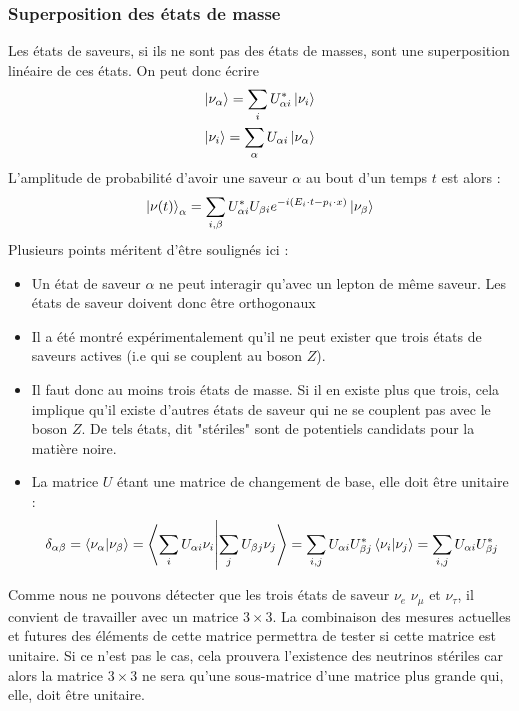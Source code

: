             \subsubsection{Superposition des états de masse}
            Les états de saveurs, si ils ne sont pas des états de masses, sont une superposition linéaire de ces états. On peut donc écrire
            \begin{eqnarray}
            \ket{\nu_{\alpha}} = \sum_i U_{\alpha i}^*\ket{\nu_i} \label{eq::alphatoi} \\
            \ket{\nu_i} = \sum_{\alpha} U_{\alpha i}\ket{\nu_{\alpha}}
            \end{eqnarray}
            L'amplitude de probabilité d'avoir une saveur $\alpha$ au bout d'un temps $t$ est alors :
            \begin{equation}
                \ket{\nu(t)}_{\alpha} = \sum_{i,\beta} U_{\alpha i}^*U_{\beta i} e^{-i(E_i \cdot t - p_i\cdot x)}\ket{\nu_{\beta}}
            \end{equation}
            Plusieurs points méritent d'être soulignés ici :
            \begin{itemize}
                \item Un état de saveur $\alpha$ ne peut interagir qu'avec un lepton de même saveur. Les états de saveur doivent donc être orthogonaux
                \item Il a été montré expérimentalement qu'il ne peut exister que trois états de saveurs actives (i.e qui se couplent au boson $Z$)\cite{pdg2018}.
                \item Il faut donc au moins trois états de masse. Si il en existe plus que trois, cela implique qu'il existe d'autres états de saveur qui ne se couplent pas avec le boson $Z$. De tels états, dit "stériles" sont de potentiels candidats pour la matière noire.
                \item La matrice $U$ étant une matrice de changement de base, elle doit être unitaire :
                \begin{equation*}
                    \delta_{\alpha\beta} = \braket{\nu_{\alpha}}{\nu_{\beta}} = \braket{\sum_i U_{\alpha i}\nu_i}{\sum_j U_{\beta j}\nu_j} = \sum_{i,j} U_{\alpha i}U_{\beta j}^* \braket{\nu_i}{\nu_j} = \sum_{i,j} U_{\alpha i}U_{\beta j}^*
                \end{equation*}
            \end{itemize}
            Comme nous ne pouvons détecter que les trois états de saveur $\nu_e$ $\nu_{\mu}$ et $\nu_{\tau}$, il convient de travailler avec un matrice $3\times3$. La combinaison des mesures actuelles et futures des éléments de cette matrice \cite{Qian2013} permettra de tester si cette matrice est unitaire. Si ce n'est pas le cas, cela prouvera l'existence des neutrinos stériles car alors la matrice $3\times3$ ne sera qu'une sous-matrice d'une matrice plus grande qui, elle, doit être unitaire.
            
